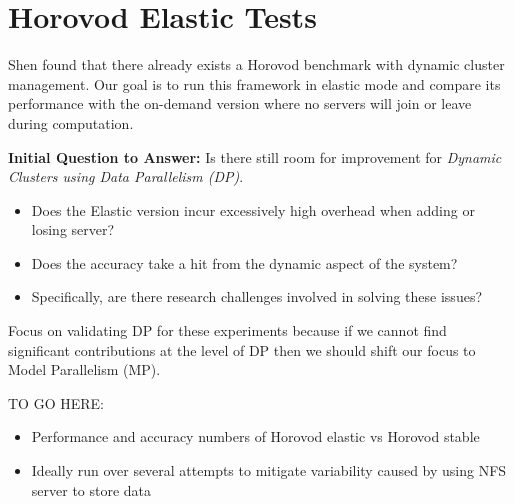 \section{Horovod Elastic Tests}
Shen found that there already exists a Horovod benchmark with dynamic
cluster management.
Our goal is to run this framework in elastic mode and compare its performance
with the on-demand version where no servers will join or leave during
computation.

\vspace{1em}
\textbf{Initial Question to Answer:} Is there still room for improvement for
\emph{Dynamic Clusters using Data Parallelism (DP)}.
\begin{itemize}
    \item Does the Elastic version incur excessively high overhead when
      adding or losing server?
    \item Does the accuracy take a hit from the dynamic aspect of the system?
    \item Specifically, are there research challenges involved in solving these
      issues?
\end{itemize}

\vspace{1em}
Focus on validating DP for these experiments because if we cannot find significant
contributions at the level of DP then we should shift our focus to Model
Parallelism (MP).

\vspace{2em}
TO GO HERE:
\begin{itemize}
    \item Performance and accuracy numbers of Horovod elastic vs Horovod stable
    \item Ideally run over several attempts to mitigate variability caused by
      using NFS server to store data
\end{itemize}
